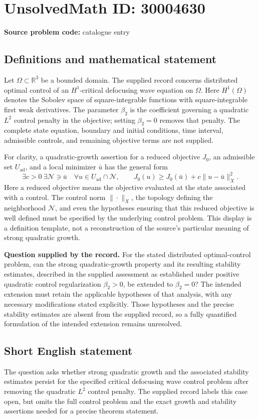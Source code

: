 \documentclass[11pt]{article}
\newcommand{\R}{\mathbb{R}}
\begin{document}
\section*{UnsolvedMath ID: 30004630}
\textbf{Source problem code:} catalogue entry
\subsection{Definitions and mathematical statement}
Let \(\Omega\subset\R^3\) be a bounded domain. The supplied record concerns distributed optimal control of an \(H^1\)-critical defocusing wave equation on \(\Omega\). Here \(H^1(\Omega)\) denotes the Sobolev space of square-integrable functions with square-integrable first weak derivatives. The parameter \(\beta_2\) is the coefficient governing a quadratic \(L^2\) control penalty in the objective; setting \(\beta_2=0\) removes that penalty. The complete state equation, boundary and initial conditions, time interval, admissible controls, and remaining objective terms are not supplied.

For clarity, a quadratic-growth assertion for a reduced objective \(J_0\), an admissible set \(U_{\mathrm{ad}}\), and a local minimizer \(\bar u\) has the general form
\[
\exists c>0\ \exists\mathcal N\ni\bar u\quad
\forall u\in U_{\mathrm{ad}}\cap\mathcal N,
\qquad J_0(u)\ge J_0(\bar u)+c\|u-\bar u\|_X^2.
\]
Here a reduced objective means the objective evaluated at the state associated with a control. The control norm \(\|\cdot\|_X\), the topology defining the neighborhood \(\mathcal N\), and even the hypotheses ensuring that this reduced objective is well defined must be specified by the underlying control problem. This display is a definition template, not a reconstruction of the source's particular meaning of strong quadratic growth.

\textbf{Question supplied by the record.} For the stated distributed optimal-control problem, can the strong quadratic-growth property and its resulting stability estimates, described in the supplied assessment as established under positive quadratic control regularization \(\beta_2>0\), be extended to \(\beta_2=0\)? The intended extension must retain the applicable hypotheses of that analysis, with any necessary modifications stated explicitly. Those hypotheses and the precise stability estimates are absent from the supplied record, so a fully quantified formulation of the intended extension remains unresolved.
\subsection{Short English statement}
The question asks whether strong quadratic growth and the associated stability estimates persist for the specified critical defocusing wave control problem after removing the quadratic \(L^2\) control penalty. The supplied record labels this case open, but omits the full control problem and the exact growth and stability assertions needed for a precise theorem statement.
\end{document}
